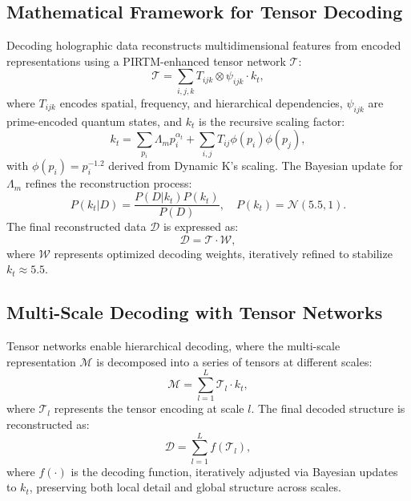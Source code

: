 \documentclass{article}
\theoremstyle{plain}
\begin{document}
\subsection{Mathematical Framework for Tensor Decoding}
Decoding holographic data reconstructs multidimensional features from encoded representations using a PIRTM-enhanced tensor network \( \mathcal{T} \):
\begin{equation}
\mathcal{T} = \sum_{i,j,k} T_{ijk} \otimes \psi_{ijk} \cdot k_t,
\end{equation}
where \( T_{ijk} \) encodes spatial, frequency, and hierarchical dependencies, \( \psi_{ijk} \) are prime-encoded quantum states, and \( k_t \) is the recursive scaling factor:
\begin{equation}
k_t = \sum_{p_i} \Lambda_m p_i^{\alpha_t} + \sum_{i,j} T_{ij} \phi(p_i) \phi(p_j),
\end{equation}
with \( \phi(p_i) = p_i^{-1.2} \) derived from Dynamic K’s scaling. The Bayesian update for \( \Lambda_m \) refines the reconstruction process:
\begin{equation}
P(k_t | D) = \frac{P(D | k_t) P(k_t)}{P(D)}, \quad P(k_t) = \mathcal{N}(5.5, 1).
\end{equation}
The final reconstructed data \( \mathcal{D} \) is expressed as:
\begin{equation}
\mathcal{D} = \mathcal{T} \cdot \mathcal{W},
\end{equation}
where \( \mathcal{W} \) represents optimized decoding weights, iteratively refined to stabilize \( k_t \approx 5.5 \).

\subsection{Multi-Scale Decoding with Tensor Networks}
Tensor networks enable hierarchical decoding, where the multi-scale representation \( \mathcal{M} \) is decomposed into a series of tensors at different scales:
\begin{equation}
\mathcal{M} = \sum_{l=1}^{L} \mathcal{T}_l \cdot k_t,
\end{equation}
where \( \mathcal{T}_l \) represents the tensor encoding at scale \( l \). The final decoded structure is reconstructed as:
\begin{equation}
\mathcal{D} = \sum_{l=1}^{L} f(\mathcal{T}_l),
\end{equation}
where \( f(\cdot) \) is the decoding function, iteratively adjusted via Bayesian updates to \( k_t \), preserving both local detail and global structure across scales.
\end{document}
